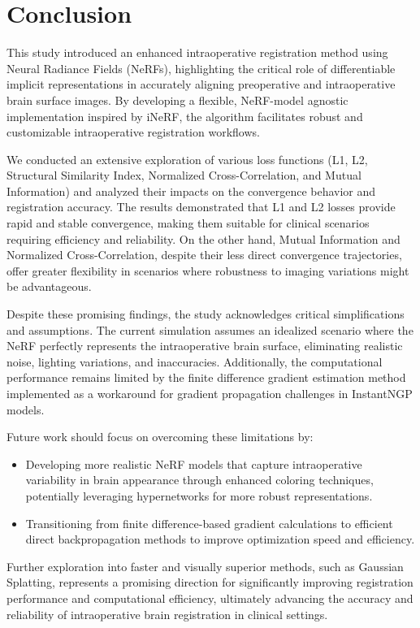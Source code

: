 
\chapter{Conclusion}\label{chapter:conclusion}

This study introduced an enhanced intraoperative registration method using Neural Radiance Fields (NeRFs), highlighting the critical role of differentiable implicit representations in accurately aligning preoperative and intraoperative brain surface images. By developing a flexible, NeRF-model agnostic implementation inspired by iNeRF, the algorithm facilitates robust and customizable intraoperative registration workflows.

We conducted an extensive exploration of various loss functions (L1, L2, Structural Similarity Index, Normalized Cross-Correlation, and Mutual Information) and analyzed their impacts on the convergence behavior and registration accuracy. The results demonstrated that L1 and L2 losses provide rapid and stable convergence, making them suitable for clinical scenarios requiring efficiency and reliability. On the other hand, Mutual Information and Normalized Cross-Correlation, despite their less direct convergence trajectories, offer greater flexibility in scenarios where robustness to imaging variations might be advantageous.

Despite these promising findings, the study acknowledges critical simplifications and assumptions. The current simulation assumes an idealized scenario where the NeRF perfectly represents the intraoperative brain surface, eliminating realistic noise, lighting variations, and inaccuracies. Additionally, the computational performance remains limited by the finite difference gradient estimation method implemented as a workaround for gradient propagation challenges in InstantNGP models.

Future work should focus on overcoming these limitations by:
\begin{itemize}
\item Developing more realistic NeRF models that capture intraoperative variability in brain appearance through enhanced coloring techniques, potentially leveraging hypernetworks for more robust representations.
\item Transitioning from finite difference-based gradient calculations to efficient direct backpropagation methods to improve optimization speed and efficiency.
\end{itemize}

Further exploration into faster and visually superior methods, such as Gaussian Splatting, represents a promising direction for significantly improving registration performance and computational efficiency, ultimately advancing the accuracy and reliability of intraoperative brain registration in clinical settings.

